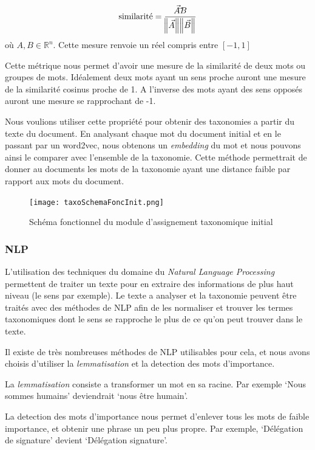 \begin{equation}
	\text{similarité} = \frac{\vec{A} \dot \vec{B}}{\norm{\vec{A}}\norm{\vec{B}}}
	\label{eq:distCosine}
\end{equation}
où $A, B  \in \mathbb{R}^n$.
Cette mesure renvoie un réel compris entre $[-1, 1]$

Cette métrique nous permet d'avoir une mesure de la similarité de deux mots ou groupes de mots.
Idéalement deux mots ayant un sens proche auront une mesure de la similarité cosinus proche de 1.
A l'inverse des mots ayant des sens opposés auront une mesure se rapprochant de -1. 

Nous voulions utiliser cette propriété pour obtenir des taxonomies a partir du texte du document.
En analysant chaque mot du document initial et en le passant par un word2vec, nous obtenons un \textit{embedding} du mot et nous pouvons ainsi le comparer avec l'ensemble de la taxonomie.
Cette méthode permettrait de donner au documents les mots de la taxonomie ayant une distance faible par rapport aux mots du document. 

\begin{figure}[h!]
  \centering
  \texttt{[image: taxoSchemaFoncInit.png]}
	\caption[]{Schéma fonctionnel du module d'assignement taxonomique initial}
	\label{fig:taxoInit}
\end{figure}

\subsubsection{NLP}
L'utilisation des techniques du domaine du \textit{Natural Language Processing} permettent de traiter un texte pour en extraire des informations de plus haut niveau (le sens par exemple).
Le texte a analyser et la taxonomie peuvent être traités avec des méthodes de NLP afin de les normaliser et trouver les termes taxonomiques dont le sens se rapproche le plus de ce qu'on peut trouver dans le texte.

Il existe de très nombreuses méthodes de NLP utilisables pour cela, et nous avons choisis d'utiliser la \textit{lemmatisation} et la detection des mots d'importance.

La \textit{lemmatisation} consiste a transformer un mot en sa racine.
Par exemple `Nous sommes humains' deviendrait `nous être humain'.

La detection des mots d'importance nous permet d'enlever tous les mots de faible importance, et obtenir une phrase un peu plus propre.
Par exemple, `Délégation de signature' devient `Délégation signature'.


